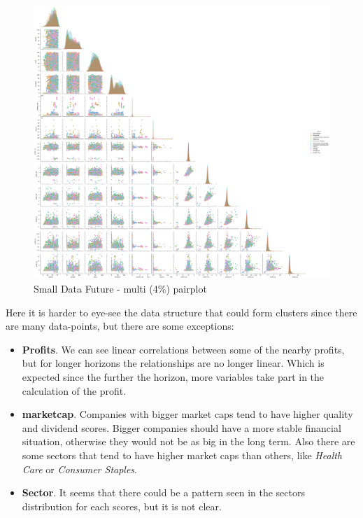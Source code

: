\documentclass[11pt,english,a4paper,hidelinks]{book}
\begin{document}
\begin{figure}[H]
    \centering
    \includegraphics[width=1\textwidth]{images/code/descriptive analysis/correlations/Small Data future - Multi - pairplot.png}
    \caption{Small Data Future - \acrshort{multi} (4\%) \acrshort{pairplot}}
    \label{fig:pairplot_small_data_future_multi}
\end{figure}

\noindent Here it is harder to eye-see the data structure that could form clusters since there are many data-points, but there are some exceptions:
\begin{itemize}
    \item \textbf{Profits}. We can see linear correlations between some of the nearby profits, but for longer horizons the relationships are no longer linear. Which is expected since the further the horizon, more variables take part in the calculation of the profit.
    \item \textbf{\acrshort{marketcap}}. Companies with bigger market caps tend to have higher quality and dividend scores. Bigger companies should have a more stable financial situation, otherwise they would not be as big in the long term. Also there are some sectors that tend to have higher market caps than others, like \textit{Health Care} or \textit{Consumer Staples}.
    \item \textbf{Sector}. It seems that there could be a pattern seen in the sectors distribution for each scores, but it is not clear.
\end{itemize}
\end{document}
